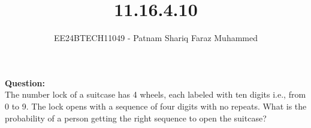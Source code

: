 \documentclass[journal]{IEEEtran}
\numberwithin{equation}{enumi}
\numberwithin{figure}{enumi}
\begin{document}


\title{11.16.4.10}
\author{EE24BTECH11049 - Patnam Shariq Faraz Muhammed}

{\let\newpage\relax\maketitle}

\textbf{Question:}\\
The number lock of a suitcase has 4 wheels, each labeled with ten digits i.e., from 0 to 9. The lock opens with a sequence of four digits with no repeats. What is the probability of a person getting the right sequence to open the suitcase?\\
\end{document}
